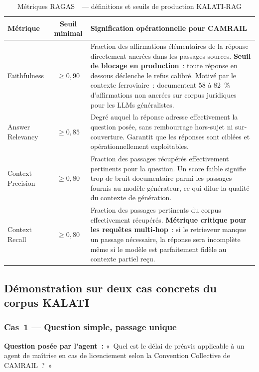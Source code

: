 \documentclass[12pt,a4paper]{report}
\begin{document}
\begin{table}
\centering
\caption{Métriques RAGAS~\autocite{Es2024}~--- définitions et seuils de production KALATI-RAG}
\label{tab:ragas-metriques}
\small
\renewcommand{\arraystretch}{1.2}
\begin{tabularx}{\textheight}{@{} l c X @{}}
\toprule
\textbf{Métrique} & \textbf{Seuil minimal} & \textbf{Signification opérationnelle pour CAMRAIL} \\
\midrule
Faithfulness &
$\geq 0{,}90$ &
Fraction des affirmations élémentaires de la réponse directement ancrées dans les passages
sources. \textbf{Seuil de blocage en production}~: toute réponse en dessous déclenche le refus
calibré. Motivé par le contexte ferroviaire~: \textcite{Dahl2024} documentent 58 à 82~\%
d'affirmations non ancrées sur corpus juridiques pour les LLMs généralistes. \\
\addlinespace
Answer Relevancy &
$\geq 0{,}85$ &
Degré auquel la réponse adresse effectivement la question posée, sans rembourrage hors-sujet
ni sur-couverture. Garantit que les réponses sont ciblées et opérationnellement exploitables. \\
\addlinespace
Context Precision &
$\geq 0{,}80$ &
Fraction des passages récupérés effectivement pertinents pour la question. Un score faible
signifie trop de bruit documentaire parmi les passages fournis au modèle générateur, ce qui
dilue la qualité du contexte de génération. \\
\addlinespace
Context Recall &
$\geq 0{,}80$ &
Fraction des passages pertinents du corpus effectivement récupérés. \textbf{Métrique critique
pour les requêtes multi-hop}~: si le retrieveur manque un passage nécessaire, la réponse sera
incomplète même si le modèle est parfaitement fidèle au contexte partiel reçu. \\
\bottomrule
\end{tabularx}
\end{table}

\subsection{Démonstration sur deux cas concrets du corpus KALATI}

\subsubsection*{Cas~1 --- Question simple, passage unique}

\textbf{Question posée par l'agent~:} «~Quel est le délai de préavis applicable à un agent de
maîtrise en cas de licenciement selon la Convention Collective de CAMRAIL~?~»
\end{document}
